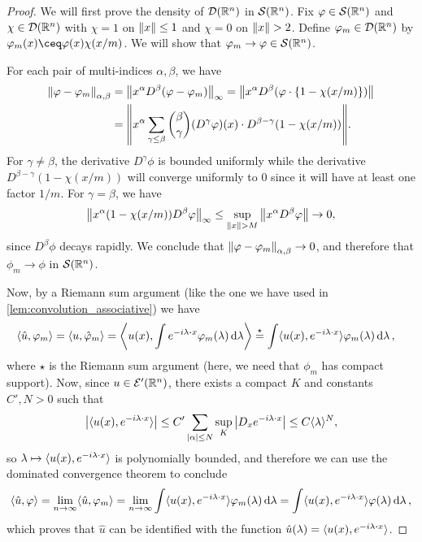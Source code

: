\begin{proof}
	We will first prove the density of $\mathcal D(\mathbb R^n)$ in $\mathcal S(\mathbb R^n)$. 
	Fix $\varphi \in \mathcal S(\mathbb R^n)$ and $\chi \in \mathcal D(\mathbb R^n)$ with $\chi = 1$ on $\norm{x}\leq1$ and $\chi = 0$ on $\norm{x}>2$. Define $\varphi_m \in \mathcal D(\mathbb R^n)$ by $\phi_m(x) \ceq \phi(x) \chi(x/m)$. We will show that $\varphi_m \to \varphi \in \mathcal S(\mathbb R^n)$. 
	
	For each pair of multi-indices $\alpha, \beta$, we have
	\begin{align*}
		\norm{\varphi - \varphi_m}_{\alpha, \beta} &= \norm{x^\alpha D^\beta( \varphi - \varphi_m)}_\infty = \norm{x^\alpha D^\beta(\varphi \cdot \qty{1 - \chi(x/m)})} \\
		&= \norm{x^\alpha \sum_{\gamma \leq \beta} \binom\beta\gamma (D^\gamma\varphi)(x) \cdot D^{\beta - \gamma} (1 - \chi(x/m))}. 
	\end{align*}
	For $\gamma \neq \beta$, the derivative $D^\gamma\phi$ is bounded uniformly while the derivative $D^{\beta - \gamma} (1 - \chi(x/m))$ will converge uniformly to 0 since it will have at least one factor $1/m$. For $\gamma = \beta$, we have
	\[
	\norm{x^\alpha (1 - \chi(x/m)) D^\beta\varphi}_\infty \leq \sup_{\norm{x} > M} \norm{x^\alpha D^\beta\varphi} \to 0,
	\]
	since $D^\beta\phi$ decays rapidly. We conclude that $\norm{\varphi - \varphi_m}_{\alpha, \beta} \to 0$, and therefore that $\phi_m \to \phi$ in $\mathcal S(\mathbb R^n)$. 
	
	Now, by a Riemann sum argument (like the one we have used in \cref{lem:convolution_associative}) we have
	\begin{align*}
		\ang{\hat u, \phi_m} &= \ang{u, \hat \phi_m} = \ang*{u(x), \int e^{-i\lambda\vdot x} \phi_m(\lambda) \dd{\lambda}} 
		\overset\star= \int \ang{u(x), e^{-i\lambda\cdot x}} \phi_m(\lambda) \dd{\lambda}, 
		\end{align*}
	where $\star$ is the Riemann sum argument (here, we need that $\phi_m$ has compact support).  Now, since $u \in \mathcal E'(\mathbb R^n)$, there exists a compact $K$ and constants $C', N > 0$ such that
	\[
	\abs{\langle u(x), e^{-i\lambda\cdot x}\rangle} \leq C' \sum_{\abs{\alpha} \leq N} \sup_K \abs{D_x e^{-i\lambda\cdot x}} \leq C \langle\lambda\rangle^N, 
	\]
	so $\lambda \mapsto \langle u(x), e^{-i\lambda\cdot x}\rangle$ is polynomially bounded, and therefore we can use the dominated convergence theorem to conclude
	\[
	\langle\hat u, \varphi\rangle = \lim_{n\to\infty} \langle\hat u, \varphi_m\rangle = \lim_{n\to\infty} \int \langle u(x), e^{-i\lambda\cdot x}\rangle \varphi_m(\lambda) \dd{\lambda} = \int \langle u(x), e^{-i\lambda\cdot x}\rangle \varphi(\lambda) \dd{\lambda}, 
	\]
	which proves that $\hat u$ can be identified with the function $\hat u(\lambda) = \ang{u(x), e^{-i\lambda\vdot x}}$. 
\end{proof}

